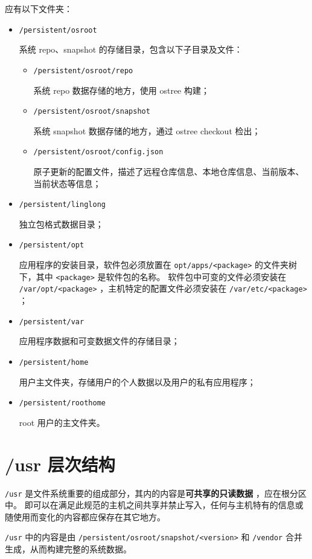 \documentclass{utart}
\begin{document}
应有以下文件夹：
\begin{itemize}[leftmargin=4em]
\item \texttt{/persistent/osroot}

  系统 repo、snapshot 的存储目录，包含以下子目录及文件：
  \begin{itemize}
  \item \texttt{/persistent/osroot/repo}

    系统 repo 数据存储的地方，使用 ostree 构建；
  \item \texttt{/persistent/osroot/snapshot}

    系统 snapshot 数据存储的地方，通过 ostree checkout 检出；
  \item \texttt{/persistent/osroot/config.json}

    原子更新的配置文件，描述了远程仓库信息、本地仓库信息、当前版本、当前状态等信息；
  \end{itemize}
\item \texttt{/persistent/linglong}

  独立包格式数据目录；
\item \texttt{/persistent/opt}

  应用程序的安装目录，软件包必须放置在 \texttt{opt/apps/<package>} 的文件夹树下，其中 \texttt{<package>} 是软件包的名称。
  软件包中可变的文件必须安装在 \texttt{/var/opt/<package>} ，主机特定的配置文件必须安装在 \texttt{/var/etc/<package>} ；
\item \texttt{/persistent/var}

  应用程序数据和可变数据文件的存储目录；
\item \texttt{/persistent/home}

  用户主文件夹，存储用户的个人数据以及用户的私有应用程序；
\item \texttt{/persistent/roothome}

  root 用户的主文件夹。
\end{itemize}

\section{/usr 层次结构}
\texttt{/usr} 是文件系统重要的组成部分，其内的内容是\textbf{可共享的只读数据} ，应在根分区中。
即可以在满足此规范的主机之间共享并禁止写入，任何与主机特有的信息或随使用而变化的内容都应保存在其它地方。

\texttt{/usr} 中的内容是由 \texttt{/persistent/osroot/snapshot/<version>} 和 \texttt{/vendor} 合并生成，从而构建完整的系统数据。
\end{document}
